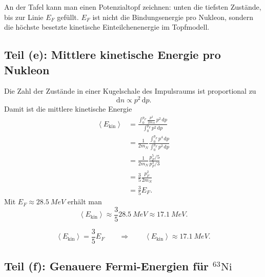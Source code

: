 \documentclass[11pt,a4paper]{scrartcl}
\newcommand{\avg}[1]{\left\langle #1 \right\rangle}
\newcommand{\dd}{\,\mathrm{d}}
\newcommand{\isotope}[2]{^{#1}\mathrm{#2}}
\theoremstyle{definition}
\theoremstyle{plain}
\theoremstyle{remark}
\begin{document}
\begin{talkbox}
An der Tafel kann man einen Potenzialtopf zeichnen: unten die tiefsten Zustände, bis zur Linie \(E_F\) gefüllt. \(E_F\) ist nicht die Bindungsenergie pro Nukleon, sondern die höchste besetzte kinetische Einteilchenenergie im Topfmodell.
\end{talkbox}

\subsection{Teil (e): Mittlere kinetische Energie pro Nukleon}

\begin{calculationbox}
Die Zahl der Zustände in einer Kugelschale des Impulsraums ist proportional zu
\[
    \dd n \propto p^2\dd p.
\]
Damit ist die mittlere kinetische Energie
\begin{align*}
    \avg{E_{\mathrm{kin}}}
    &= \frac{\int_0^{p_F}\frac{p^2}{2m_N}\,p^2\dd p}{\int_0^{p_F}p^2\dd p}\\
    &= \frac{1}{2m_N}\frac{\int_0^{p_F}p^4\dd p}{\int_0^{p_F}p^2\dd p}\\
    &= \frac{1}{2m_N}\frac{p_F^5/5}{p_F^3/3}\\
    &= \frac{3}{5}\frac{p_F^2}{2m_N}\\
    &= \frac{3}{5}E_F.
\end{align*}
Mit \(E_F\approx\SI{28.5}{MeV}\) erhält man
\[
    \avg{E_{\mathrm{kin}}}\approx \frac{3}{5}\SI{28.5}{MeV}\approx\SI{17.1}{MeV}.
\]
\end{calculationbox}

\begin{answerbox}
\[
    \boxed{\avg{E_{\mathrm{kin}}}=\frac{3}{5}E_F}
    \qquad\Rightarrow\qquad
    \boxed{\avg{E_{\mathrm{kin}}}\approx\SI{17.1}{MeV}}.
\]
\end{answerbox}

\subsection{Teil (f): Genauere Fermi-Energien für \texorpdfstring{$\isotope{63}{Ni}$}{Ni-63}}
\end{document}
